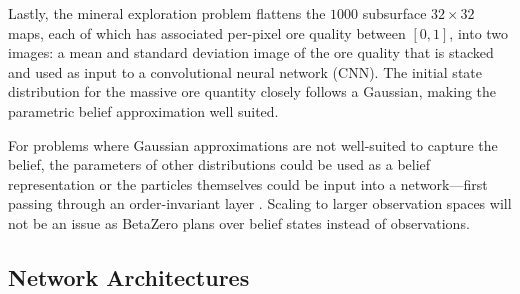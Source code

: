 Lastly, the mineral exploration problem flattens the $1000$ subsurface $32\times32$ maps, each of which has associated per-pixel ore quality between $[0,1]$, into two images: a mean and standard deviation image of the ore quality that is stacked and used as input to a convolutional neural network (CNN).
The initial state distribution for the massive ore quantity closely follows a Gaussian, making the parametric belief approximation well suited.

For problems where Gaussian approximations are not well-suited to capture the belief, the parameters of other distributions could be used as a belief representation or the particles themselves could be input into a network---first passing through an order-invariant layer \cite{igl2018deep}.
Scaling to larger observation spaces will not be an issue as BetaZero plans over belief states instead of observations.

\subsection{Network Architectures}


